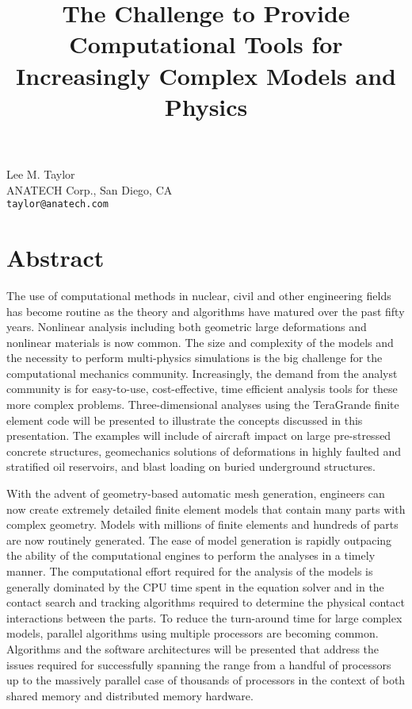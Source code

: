\title{The Challenge to Provide Computational Tools for Increasingly Complex Models and Physics}
\author{} \institute{}
\maketitle

\begin{center}
{\large Lee M. Taylor}\\
ANATECH Corp., San Diego, CA\\
{\tt taylor@anatech.com}
\end{center}

\section*{Abstract}
The use of computational methods in nuclear, civil and other engineering fields has become routine as the theory and algorithms have matured over the past fifty years. Nonlinear analysis including both geometric large deformations and nonlinear materials is now common. The size and complexity of the models and the necessity to perform multi-physics simulations is the big challenge for the computational mechanics community. Increasingly, the demand from the analyst community is for easy-to-use, cost-effective, time efficient analysis tools for these more complex problems. Three-dimensional analyses using the TeraGrande finite element code \cite{taylor1} will be presented to illustrate the concepts discussed in this presentation. The examples will include of aircraft impact on large pre-stressed concrete structures\cite{taylor2}, geomechanics solutions of deformations in highly faulted and stratified oil reservoirs, and blast loading on buried underground structures.

With the advent of geometry-based automatic mesh generation, engineers can now create extremely detailed finite element models that contain many parts with complex geometry. Models with millions of finite elements and hundreds of parts are now routinely generated. The ease of model generation is rapidly outpacing the ability of the computational engines to perform the analyses in a timely manner. The computational effort required for the analysis of the models is generally dominated by the CPU time spent in the equation solver and in the contact search and tracking algorithms required to determine the physical contact interactions between the parts. To reduce the turn-around time for large complex models, parallel algorithms using multiple processors are becoming common. Algorithms and the software architectures will be presented that address the issues required for successfully spanning the range from a handful of processors up to the massively parallel case of thousands of
processors in the context of both shared memory and distributed memory hardware.

